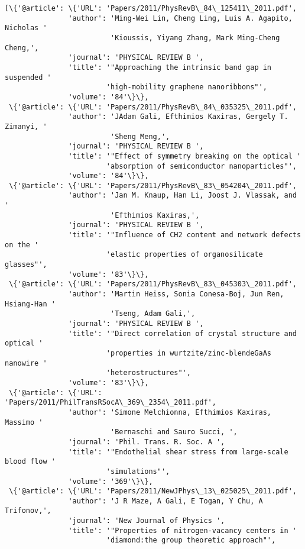 \documentclass[11pt]{article}
\begin{document}
    \begin{Verbatim}[commandchars=\\\{\}]
[\{'@article': \{'URL': 'Papers/2011/PhysRevB\_84\_125411\_2011.pdf',
               'author': 'Ming-Wei Lin, Cheng Ling, Luis A. Agapito, Nicholas '
                         'Kioussis, Yiyang Zhang, Mark Ming-Cheng Cheng,',
               'journal': 'PHYSICAL REVIEW B ',
               'title': '"Approaching the intrinsic band gap in suspended '
                        'high-mobility graphene nanoribbons"',
               'volume': '84'\}\},
 \{'@article': \{'URL': 'Papers/2011/PhysRevB\_84\_035325\_2011.pdf',
               'author': 'JAdam Gali, Efthimios Kaxiras, Gergely T. Zimanyi, '
                         'Sheng Meng,',
               'journal': 'PHYSICAL REVIEW B ',
               'title': '"Effect of symmetry breaking on the optical '
                        'absorption of semiconductor nanoparticles"',
               'volume': '84'\}\},
 \{'@article': \{'URL': 'Papers/2011/PhysRevB\_83\_054204\_2011.pdf',
               'author': 'Jan M. Knaup, Han Li, Joost J. Vlassak, and '
                         'Efthimios Kaxiras,',
               'journal': 'PHYSICAL REVIEW B ',
               'title': '"Influence of CH2 content and network defects on the '
                        'elastic properties of organosilicate glasses"',
               'volume': '83'\}\},
 \{'@article': \{'URL': 'Papers/2011/PhysRevB\_83\_045303\_2011.pdf',
               'author': 'Martin Heiss, Sonia Conesa-Boj, Jun Ren, Hsiang-Han '
                         'Tseng, Adam Gali,',
               'journal': 'PHYSICAL REVIEW B ',
               'title': '"Direct correlation of crystal structure and optical '
                        'properties in wurtzite/zinc-blendeGaAs nanowire '
                        'heterostructures"',
               'volume': '83'\}\},
 \{'@article': \{'URL': 'Papers/2011/PhilTransRSocA\_369\_2354\_2011.pdf',
               'author': 'Simone Melchionna, Efthimios Kaxiras, Massimo '
                         'Bernaschi and Sauro Succi, ',
               'journal': 'Phil. Trans. R. Soc. A ',
               'title': '"Endothelial shear stress from large-scale blood flow '
                        'simulations"',
               'volume': '369'\}\},
 \{'@article': \{'URL': 'Papers/2011/NewJPhys\_13\_025025\_2011.pdf',
               'author': 'J R Maze, A Gali, E Togan, Y Chu, A Trifonov,',
               'journal': 'New Journal of Physics ',
               'title': '"Properties of nitrogen-vacancy centers in '
                        'diamond:the group theoretic approach"',

\end{Verbatim}
\end{document}
